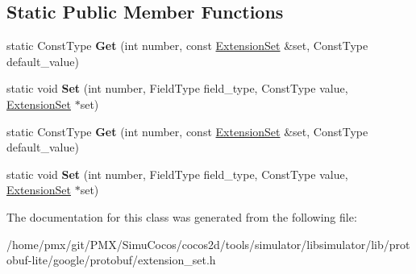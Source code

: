 \subsection*{Static Public Member Functions}
\begin{DoxyCompactItemize}
\item 
\mbox{\label{classgoogle_1_1protobuf_1_1internal_1_1EnumTypeTraits_a0bb87573cf9be2daa96fcee5e4b43aa4}} 
static Const\+Type {\bfseries Get} (int number, const \hyperlink{classgoogle_1_1protobuf_1_1internal_1_1ExtensionSet}{Extension\+Set} \&set, Const\+Type default\+\_\+value)
\item 
\mbox{\label{classgoogle_1_1protobuf_1_1internal_1_1EnumTypeTraits_a1b2a9782915049bf8bb348d063755d99}} 
static void {\bfseries Set} (int number, Field\+Type field\+\_\+type, Const\+Type value, \hyperlink{classgoogle_1_1protobuf_1_1internal_1_1ExtensionSet}{Extension\+Set} $\ast$set)
\item 
\mbox{\label{classgoogle_1_1protobuf_1_1internal_1_1EnumTypeTraits_a0bb87573cf9be2daa96fcee5e4b43aa4}} 
static Const\+Type {\bfseries Get} (int number, const \hyperlink{classgoogle_1_1protobuf_1_1internal_1_1ExtensionSet}{Extension\+Set} \&set, Const\+Type default\+\_\+value)
\item 
\mbox{\label{classgoogle_1_1protobuf_1_1internal_1_1EnumTypeTraits_a1b2a9782915049bf8bb348d063755d99}} 
static void {\bfseries Set} (int number, Field\+Type field\+\_\+type, Const\+Type value, \hyperlink{classgoogle_1_1protobuf_1_1internal_1_1ExtensionSet}{Extension\+Set} $\ast$set)
\end{DoxyCompactItemize}


The documentation for this class was generated from the following file\+:\begin{DoxyCompactItemize}
\item 
/home/pmx/git/\+P\+M\+X/\+Simu\+Cocos/cocos2d/tools/simulator/libsimulator/lib/protobuf-\/lite/google/protobuf/extension\+\_\+set.\+h\end{DoxyCompactItemize}
